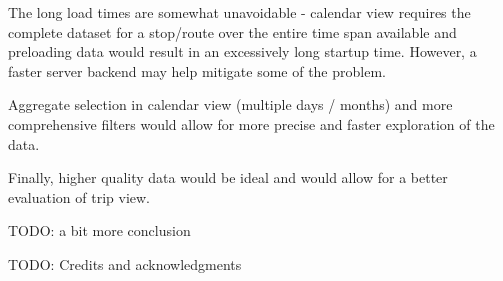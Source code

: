 \documentclass[journal]{vgtc}                %
\begin{document}
The long load times are somewhat unavoidable - calendar view requires the complete dataset for a stop/route over the entire time span available and preloading data would result in an excessively long startup time. However, a faster server backend may help mitigate some of the problem.

Aggregate selection in calendar view (multiple days / months) and more comprehensive filters would allow for more precise and faster exploration of the data.

Finally, higher quality data would be ideal and would allow for a better evaluation of trip view.

TODO: a bit more conclusion

TODO: Credits and acknowledgments


%

\end{document}
